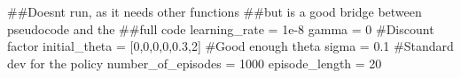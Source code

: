 \documentclass[
  letterpaper,
]{report}
\newenvironment{Shaded}{\begin{snugshade}}{\end{snugshade}}
\newcommand{\CommentTok}[1]{\textcolor[rgb]{0.37,0.37,0.37}{#1}}
\newcommand{\DecValTok}[1]{\textcolor[rgb]{0.68,0.00,0.00}{#1}}
\newcommand{\FloatTok}[1]{\textcolor[rgb]{0.68,0.00,0.00}{#1}}
\newcommand{\NormalTok}[1]{\textcolor[rgb]{0.00,0.23,0.31}{#1}}
\newcommand{\OperatorTok}[1]{\textcolor[rgb]{0.37,0.37,0.37}{#1}}
\theoremstyle{definition}
\theoremstyle{plain}
\theoremstyle{definition}
\theoremstyle{remark}
\begin{document}
\begin{Shaded}
\begin{Highlighting}[]
\CommentTok{\#\#Doesn\textquotesingle{}t run, as it needs other functions}
\CommentTok{\#\#but is a good bridge between pseudocode and the}
\CommentTok{\#\#full code}
\NormalTok{learning\_rate }\OperatorTok{=} \FloatTok{1e{-}8}
\NormalTok{gamma }\OperatorTok{=} \DecValTok{0} \CommentTok{\#Discount factor}
\NormalTok{initial\_theta }\OperatorTok{=}\NormalTok{ [}\DecValTok{0}\NormalTok{,}\DecValTok{0}\NormalTok{,}\DecValTok{0}\NormalTok{,}\DecValTok{0}\NormalTok{,}\FloatTok{0.3}\NormalTok{,}\DecValTok{2}\NormalTok{] }\CommentTok{\#Good enough theta}
\NormalTok{sigma }\OperatorTok{=} \FloatTok{0.1} \CommentTok{\#Standard dev for the policy}
\NormalTok{number\_of\_episodes }\OperatorTok{=} \DecValTok{1000} 
\NormalTok{episode\_length }\OperatorTok{=} \DecValTok{20}



\end{Highlighting}
\end{Shaded}
\end{document}
